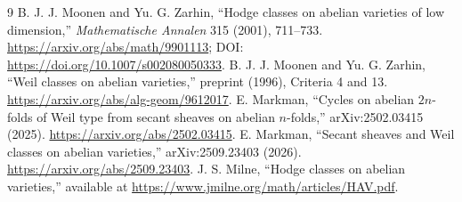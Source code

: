 \documentclass[11pt]{article}
\begin{document}
\begin{thebibliography}{9}
 B. J. J. Moonen and Yu. G. Zarhin, ``Hodge classes on abelian varieties of low dimension,'' \emph{Mathematische Annalen} 315 (2001), 711--733.  \url{https://arxiv.org/abs/math/9901113}; DOI: \url{https://doi.org/10.1007/s002080050333}.
 B. J. J. Moonen and Yu. G. Zarhin, ``Weil classes on abelian varieties,'' preprint (1996), Criteria 4 and 13.  \url{https://arxiv.org/abs/alg-geom/9612017}.
 E. Markman, ``Cycles on abelian $2n$-folds of Weil type from secant sheaves on abelian $n$-folds,'' arXiv:2502.03415 (2025).  \url{https://arxiv.org/abs/2502.03415}.
 E. Markman, ``Secant sheaves and Weil classes on abelian varieties,'' arXiv:2509.23403 (2026).  \url{https://arxiv.org/abs/2509.23403}.
 J. S. Milne, ``Hodge classes on abelian varieties,'' available at \url{https://www.jmilne.org/math/articles/HAV.pdf}.
\end{thebibliography}
\end{document}
